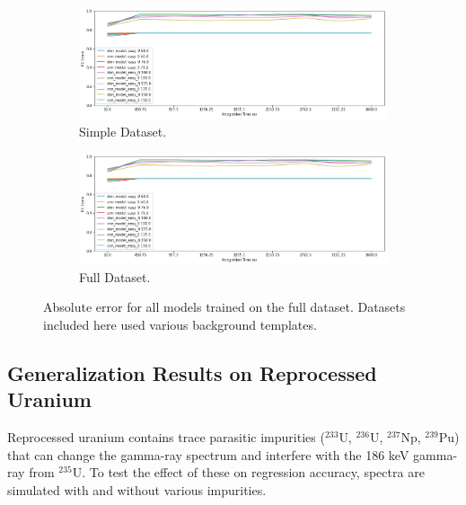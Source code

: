 \begin{figure}[H]
     \centering
     \begin{subfigure}[b]{0.9\textwidth}
         \centering
         \includegraphics[width=\textwidth]{images/results_easy_distance_comparison}
         \caption{Simple Dataset.}
         \label{fig:results_full_background_inject_simple}
     \end{subfigure}

     \begin{subfigure}[b]{0.9\textwidth}
         \centering
         \includegraphics[width=\textwidth]{images/results_easy_distance_comparison}
         \caption{Full Dataset.}
         \label{fig:results_full_background_inject_full}
     \end{subfigure}
        \caption{Absolute error for all models trained on the full dataset. Datasets included here used various background templates.}
        \label{fig:results_full_background_inject}
\end{figure}


\subsection{Generalization Results on Reprocessed Uranium}

Reprocessed uranium contains trace parasitic impurities ($^{233}$U, $^{236}$U, $^{237}$Np, $^{239}$Pu) that can change the gamma-ray spectrum and interfere with the 186 keV gamma-ray from $^{235}$U. To test the effect of these on regression accuracy, spectra are simulated with and without various impurities.


